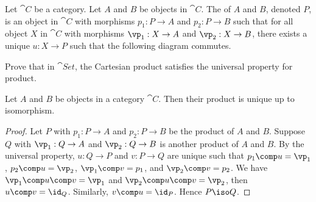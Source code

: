 \documentclass[10pt]{article}
\begin{document}
\begin{definition}
    Let $\cat{C}$ be a category. Let $A$ and $B$ be objects in $\cat{C}$. The  of $A$ and $B$, denoted $P$, is an object in $\cat{C}$ with morphisms ${p}_{1}:P\to A$ and ${p}_{2}:P\to B$ such that for all object $X$ in $\cat{C}$ with morphisms ${\vp}_{1}:X\to A$ and ${\vp}_{2}:X\to B$, there exists a unique $u:X\to P$ such that the following diagram commutes.
\end{definition}
\begin{center}
\end{center}
\begin{problem}
    Prove that in $\cat{Set}$, the Cartesian product satisfies the universal property for product.
\end{problem}
\begin{proposition}
    Let $A$ and $B$ be objects in a category $\cat{C}$. Then their product is unique up to isomorphism.
\end{proposition}
\begin{proof}
    Let $P$ with ${p}_{1}:P\to A$ and ${p}_{2}:P\to B$ be the product of $A$ and $B$. Suppose $Q$ with ${\vp}_{1}:Q\to A$ and ${\vp}_{2}:Q\to B$ is another product of $A$ and $B$. By the universal property, $u:Q\to P$ and $v:P\to Q$ are unique such that ${p}_{1}\comp u={\vp}_{1}$, ${p}_{2}\comp u={\vp}_{2}$, ${\vp}_{1}\comp v={p}_{1}$, and ${\vp}_{2}\comp v={p}_{2}$. We have ${\vp}_{1}\comp u\comp v={\vp}_{1}$ and ${\vp}_{2}\comp u\comp v={\vp}_{2}$, then $u\comp v={\id}_{Q}$. Similarly, $v\comp u={\id}_{P}$. Hence $P\iso Q$.
\end{proof}
\begin{center}
\end{center}
\end{document}
